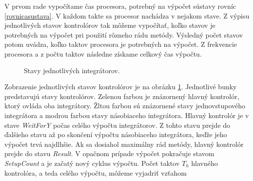 V prvom rade vypočítame čas procesora, potrebný na výpočet sústavy rovníc \ref{rovnicasustava}. V každom takte sa procesor nachádza v nejakom stave. Z výpisu jednotlivých stavov kontrolórov tak môžeme vypočítať, koľko stavov je potrebných na výpočet pri použití rôzneho rádu metódy. Výsledný počet stavov potom uvádza, koľko taktov procesora je potrebných na výpočet. Z frekvencie procesora a z počtu taktov následne získame celkový čas výpočtu.

\bigskip
\begin{figure}[h]
\centering
{}
\caption{Stavy jednotlivých integrátorov.}
\label{stavyimg}
\end{figure}

Zobrazenie jednotlivých stavov kontrolórov je na obrázku \ref{stavyimg}. Jednotlivé bunky predstavujú stavy kontrolórov. Zelenou farbou je znázornený hlavný kontrolór, ktorý ovláda oba integrátory. Žltou farbou sú znázornené stavy jednovstupového integrátora a modrou farbou stavy násobiaceho integrátora. Hlavný kontrolór je v stave \textit{WeitForY} počas celého výpočtu integrátorov. Z tohto stavu prejde do ďalšieho stavu až po skončení výpočtu násobiaceho integrátora, keďže jeho výpočet trvá najdlhšie. Ak sa dosiahol maximálny rád metódy, hlavný kontrolór prejde do stavu \textit{Result}. V opačnom prípade výpočet pokračuje stavom \textit{SetupCount} a je začatý nový cyklus výpočtu. Počet taktov $ T_h $ hlavného kontrolóra, a teda celého výpočtu, môžeme vyjadriť vzťahom


